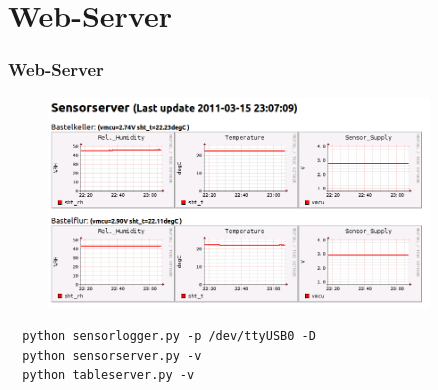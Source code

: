 \documentclass{beamer}
\begin{document}

\section{Web-Server}
\begin{frame}[fragile]
\frametitle{Web-Server}
\begin{figure}
\includegraphics[width=0.9\textwidth]{../sensorserver_graph.png}
\end{figure}


\begin{verbatim}
  python sensorlogger.py -p /dev/ttyUSB0 -D
  python sensorserver.py -v
  python tableserver.py -v
\end{verbatim}

\end{frame}

\end{document}
